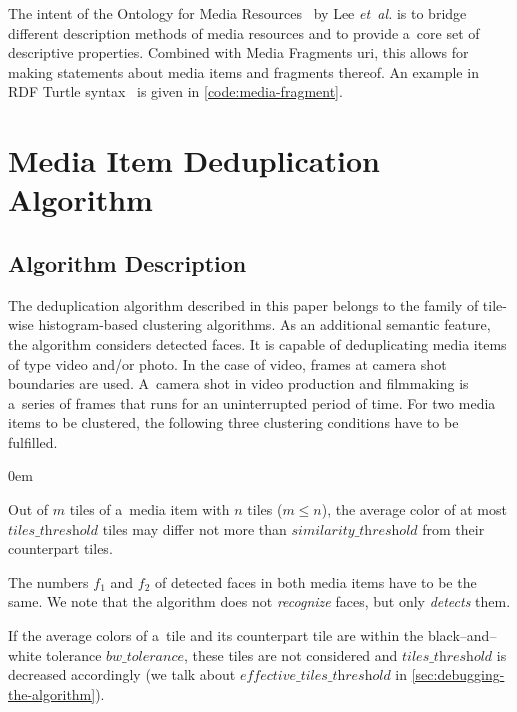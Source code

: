 \documentclass{article}
\begin{document}
The intent of the Ontology for Media Resources~\cite{lee2012mediaontology} by Lee \emph{et~al.} is to bridge different description methods of media resources
and to provide a~core set of descriptive properties. Combined with Media Fragments {\sc uri}, this allows for making statements about media items and fragments thereof. An example in RDF Turtle syntax~\cite{prudhommeaux2013turtle} is given in \autoref{code:media-fragment}.


\section{Media Item Deduplication Algorithm}
\label{sec:media-item-deduplication-algorithm}

\subsection{Algorithm Description}
The deduplication algorithm described in this paper belongs to the family of tile-wise histogram-based clustering algorithms. As an additional semantic feature, the algorithm considers detected faces. It is capable of deduplicating media items of type video and/or photo. In the case of video, frames at camera shot boundaries are used. A~camera shot in video production and filmmaking is a~series of frames that runs for an uninterrupted period of time. For two media items to be clustered, the following three clustering conditions have to be fulfilled.
\begin{description}
  \itemsep0em
  \item[Cond.~1] Out of $m$ tiles of a~media item with $n$ tiles ($m \leq n$), the average color of at most $\textit{tiles\_threshold}$ tiles may differ not more than $\textit{similarity\_threshold}$ from their counterpart tiles.
  \item[Cond.~2] The numbers $f_1$ and $f_2$ of detected faces in both media items have to be the same. We note that the algorithm does not \emph{recognize} faces, but only \emph{detects} them.
  \item[Cond.~3] If the average colors of a~tile and its counterpart tile are within the black--and--white tolerance $\textit{bw\_tolerance}$, these tiles are not considered and $\textit{tiles\_threshold}$ is decreased accordingly (we talk about $\textit{effective\_tiles\_threshold}$ in \autoref{sec:debugging-the-algorithm}).
\end{description}
\end{document}
